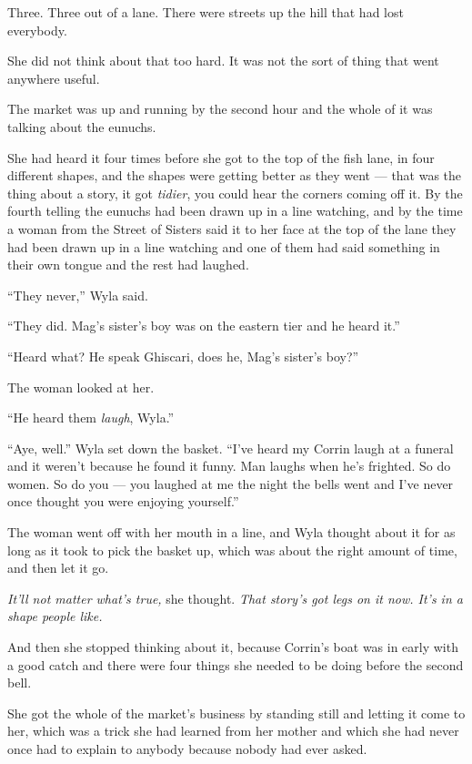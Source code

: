 Three. Three out of a lane. There were streets up the hill that had lost everybody.

She did not think about that too hard. It was not the sort of thing that went anywhere useful.

\sceneBreak

The market was up and running by the second hour and the whole of it was talking about the eunuchs.

She had heard it four times before she got to the top of the fish lane, in four different shapes, and the shapes were getting better as they went — that was the thing about a story, it got \textit{tidier}, you could hear the corners coming off it. By the fourth telling the eunuchs had been drawn up in a line watching, and by the time a woman from the Street of Sisters said it to her face at the top of the lane they had been drawn up in a line watching and one of them had said something in their own tongue and the rest had laughed.

“They never,” Wyla said.

“They did. Mag’s sister’s boy was on the eastern tier and he heard it.”

“Heard what? He speak Ghiscari, does he, Mag’s sister’s boy?”

The woman looked at her.

“He heard them \textit{laugh}, Wyla.”

“Aye, well.” Wyla set down the basket. “I’ve heard my Corrin laugh at a funeral and it weren’t because he found it funny. Man laughs when he’s frighted. So do women. So do you — you laughed at me the night the bells went and I’ve never once thought you were enjoying yourself.”

The woman went off with her mouth in a line, and Wyla thought about it for as long as it took to pick the basket up, which was about the right amount of time, and then let it go.

\textit{It’ll not matter what’s true,} she thought. \textit{That story’s got legs on it now. It’s in a shape people like.}

And then she stopped thinking about it, because Corrin’s boat was in early with a good catch and there were four things she needed to be doing before the second bell.

\sceneBreak

She got the whole of the market’s business by standing still and letting it come to her, which was a trick she had learned from her mother and which she had never once had to explain to anybody because nobody had ever asked.

